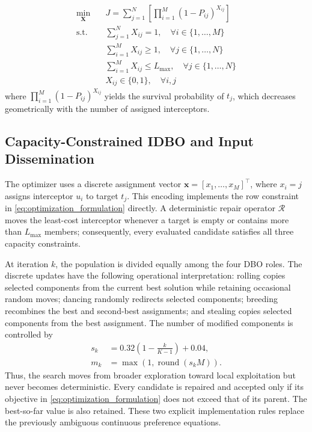 \documentclass[lettersize,journal]{IEEEtran}
\begin{document}
{\begin{equation}
\label{eq:optimization_formulation}
\begin{aligned}
\min_{\mathbf{X}} \quad & J = \sum_{j=1}^{N} \left[ \prod_{i=1}^{M} \left(1 - P_{ij}\right)^{X_{ij}} \right] \\
\text{s.t.} \quad & \sum_{j=1}^{N} X_{ij} = 1, \quad \forall i \in \{1,\dots,M\} \\
& \sum_{i=1}^{M} X_{ij} \geq 1, \quad \forall j \in \{1,\dots,N\} \\
& \sum_{i=1}^{M} X_{ij} \leq L_{\max}, \quad \forall j \in \{1,\dots,N\} \\
& X_{ij} \in \{0,1\}, \quad \forall i,j
\end{aligned}
\end{equation}
where $\prod_{i=1}^{M} (1 - P_{ij})^{X_{ij}}$ yields the survival probability of $t_j$, which decreases geometrically with the number of assigned interceptors.

\subsection{Capacity-Constrained IDBO and Input Dissemination}
\label{subsec:idbo_algorithm}

The optimizer uses a discrete assignment vector
\(\mathbf{x}=[x_1,\ldots,x_M]^\top\), where \(x_i=j\) assigns interceptor
\(u_i\) to target \(t_j\). This encoding implements the row constraint in
\eqref{eq:optimization_formulation} directly. A deterministic repair operator
\(\mathcal{R}\) moves the least-cost interceptor whenever a target is empty or
contains more than \(L_{\max}\) members; consequently, every evaluated candidate
satisfies all three capacity constraints.

At iteration \(k\), the population is divided equally among the four DBO roles.
The discrete updates have the following operational interpretation: rolling
copies selected components from the current best solution while retaining
occasional random moves; dancing randomly redirects selected components;
breeding recombines the best and second-best assignments; and stealing copies
selected components from the best assignment. The number of modified components
is controlled by
\begin{align}
\label{eq:idbo_schedule}
s_k&=0.32\left(1-\frac{k}{K-1}\right)+0.04,\\
m_k&=\max(1,\operatorname{round}(s_k M)).
\end{align}
Thus, the search moves from broader exploration toward local exploitation but
never becomes deterministic. Every candidate is repaired and accepted only if
its objective in \eqref{eq:optimization_formulation} does not exceed that of its
parent. The best-so-far value is also retained. These two explicit implementation
rules replace the previously ambiguous continuous preference equations.

}
\end{document}

